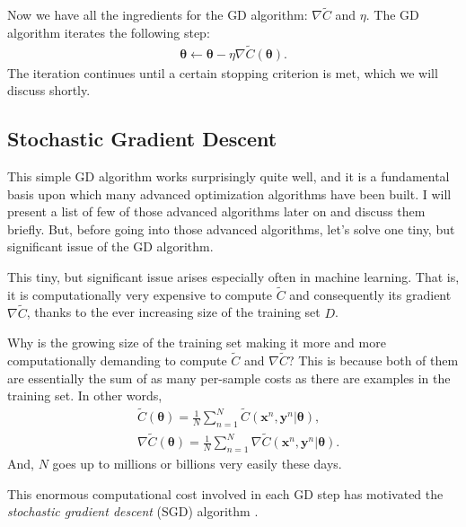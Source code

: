\documentclass{report}
\newcommand{\vect}[1]{\mathbf{#1}}
\newcommand{\vects}[1]{\boldsymbol{#1}}
\newcommand{\vx}[0]{\vect{x}}
\newcommand{\vy}[0]{\vect{y}}
\newcommand{\TT}[0]{\vects{\theta}}
\begin{document}
Now we have all the ingredients for the GD algorithm: $\nabla \tilde{C}$ and
$\eta$. The GD algorithm iterates the following step:
\begin{align}
    \label{eq:GD}
    \TT \leftarrow \TT - \eta \nabla \tilde{C}(\TT).
\end{align}
The iteration continues until a certain stopping criterion is met, which we will
discuss shortly.

\subsection{Stochastic Gradient Descent}
\label{sec:sgd}

This simple GD algorithm works surprisingly quite well, and it is a fundamental
basis upon which many advanced optimization algorithms have been built. I will
present a list of few of those advanced algorithms later on and discuss them
briefly. But, before going into those advanced algorithms, let's solve one tiny,
but significant issue of the GD algorithm.

This tiny, but significant issue arises especially often in machine learning.
That is, it is computationally very expensive to compute $\tilde{C}$ and
consequently its gradient $\nabla \tilde{C}$, thanks to the ever increasing size
of the training set $D$. 

Why is the growing size of the training set making it more and more
computationally demanding to compute $\tilde{C}$ and $\nabla \tilde{C}$?  This
is because both of them are essentially the sum of as many per-sample costs as
there are examples in the training set. In other words,
\begin{align*}
    &\tilde{C}(\TT) = \frac{1}{N} \sum_{n=1}^N \tilde{C}(\vx^n, \vy^n | \TT), \\
    &\nabla \tilde{C}(\TT) = \frac{1}{N} \sum_{n=1}^N \nabla \tilde{C}(\vx^n, \vy^n | \TT).
\end{align*}
And, $N$ goes up to millions or billions very easily these days.

This enormous computational cost involved in each GD step has motivated the {\em
stochastic gradient descent} (SGD) algorithm \citep{Robbins1951,Bottou1998}. 
\end{document}
